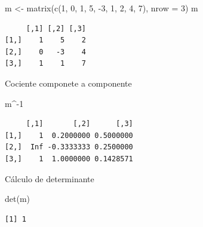 \documentclass[
  ignorenonframetext,
  aspectratio=169,
  spanish,
]{beamer}
\newenvironment{Shaded}{\begin{snugshade}}{\end{snugshade}}
\newcommand{\AttributeTok}[1]{\textcolor[rgb]{0.40,0.45,0.13}{#1}}
\newcommand{\DecValTok}[1]{\textcolor[rgb]{0.68,0.00,0.00}{#1}}
\newcommand{\FunctionTok}[1]{\textcolor[rgb]{0.28,0.35,0.67}{#1}}
\newcommand{\NormalTok}[1]{\textcolor[rgb]{0.00,0.23,0.31}{#1}}
\newcommand{\OtherTok}[1]{\textcolor[rgb]{0.00,0.23,0.31}{#1}}
\newcommand{\SpecialCharTok}[1]{\textcolor[rgb]{0.37,0.37,0.37}{#1}}
\begin{document}
\begin{frame}[fragile]{}
\label{section}
\begin{Shaded}
\begin{Highlighting}[]
\NormalTok{m }\OtherTok{\textless{}{-}} \FunctionTok{matrix}\NormalTok{(}\FunctionTok{c}\NormalTok{(}\DecValTok{1}\NormalTok{, }\DecValTok{0}\NormalTok{, }\DecValTok{1}\NormalTok{, }\DecValTok{5}\NormalTok{, }\SpecialCharTok{{-}}\DecValTok{3}\NormalTok{, }\DecValTok{1}\NormalTok{, }\DecValTok{2}\NormalTok{, }\DecValTok{4}\NormalTok{, }\DecValTok{7}\NormalTok{), }\AttributeTok{nrow =} \DecValTok{3}\NormalTok{)}
\NormalTok{m}
\end{Highlighting}
\end{Shaded}

\begin{verbatim}
     [,1] [,2] [,3]
[1,]    1    5    2
[2,]    0   -3    4
[3,]    1    1    7
\end{verbatim}

\begin{block}{Cociente componete a componente}
\label{cociente-componete-a-componente}
\begin{Shaded}
\begin{Highlighting}[]
\NormalTok{m}\SpecialCharTok{\^{}{-}}\DecValTok{1}
\end{Highlighting}
\end{Shaded}

\begin{verbatim}
     [,1]       [,2]      [,3]
[1,]    1  0.2000000 0.5000000
[2,]  Inf -0.3333333 0.2500000
[3,]    1  1.0000000 0.1428571
\end{verbatim}
\end{block}

\begin{block}{Cálculo de determinante}
\label{cuxe1lculo-de-determinante}
\begin{Shaded}
\begin{Highlighting}[]
\FunctionTok{det}\NormalTok{(m)}
\end{Highlighting}
\end{Shaded}

\begin{verbatim}
[1] 1
\end{verbatim}
\end{block}
\end{frame}
\end{document}
